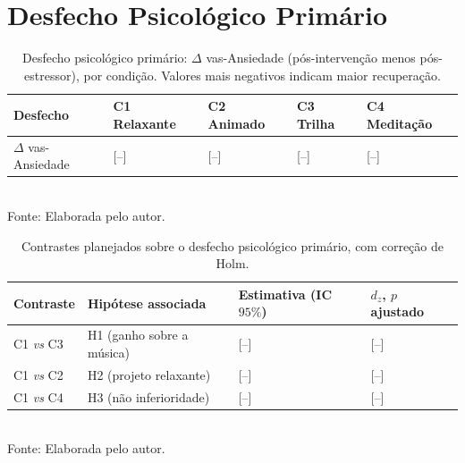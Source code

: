 \section{Desfecho Psicológico Primário}\label{sec:res-psicologico}


\begin{table}[H]
    \centering
    \caption{Desfecho psicológico primário: $\Delta$ \gls{vas}-Ansiedade (pós-intervenção menos pós-estressor), por condição. Valores mais negativos indicam maior recuperação.}
    \label{tab:res-primario}
    \small
    \begin{tabularx}{\textwidth}{p{3.2cm}YYYY}
        \toprule
        \textbf{Desfecho} & \textbf{C1 Relaxante} & \textbf{C2 Animado} & \textbf{C3 Trilha} & \textbf{C4 Meditação} \\
        \midrule
        $\Delta$ \gls{vas}-Ansiedade & [--] & [--] & [--] & [--] \\
        \bottomrule
    \end{tabularx}\\[2pt]
    {\footnotesize Fonte: Elaborada pelo autor.}
\end{table}

\begin{table}[H]
    \centering
    \caption{Contrastes planejados sobre o desfecho psicológico primário, com correção de Holm.}
    \label{tab:res-contrastes}
    \small
    \begin{tabularx}{\textwidth}{p{2.0cm}p{4.2cm}YY}
        \toprule
        \textbf{Contraste} & \textbf{Hipótese associada} & \textbf{Estimativa (IC $95\%$)} & \textbf{$d_z$, $p$ ajustado} \\
        \midrule
        C1 \textit{vs} C3 & H1 (ganho sobre a música) & [--] & [--] \\
        C1 \textit{vs} C2 & H2 (projeto relaxante) & [--] & [--] \\
        C1 \textit{vs} C4 & H3 (não inferioridade) & [--] & [--] \\
        \bottomrule
    \end{tabularx}\\[2pt]
    {\footnotesize Fonte: Elaborada pelo autor.}
\end{table}


